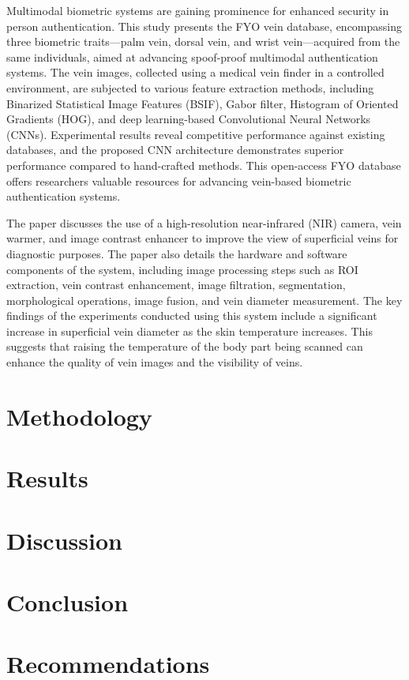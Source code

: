 \documentclass{IEEEtran}
\begin{document}
\cite{toygar2020fyo} Multimodal biometric systems are gaining prominence for enhanced security in person authentication. This study presents the FYO vein database, encompassing three biometric traits—palm vein, dorsal vein, and wrist vein—acquired from the same individuals, aimed at advancing spoof-proof multimodal authentication systems. The vein images, collected using a medical vein finder in a controlled environment, are subjected to various feature extraction methods, including Binarized Statistical Image Features (BSIF), Gabor filter, Histogram of Oriented Gradients (HOG), and deep learning-based Convolutional Neural Networks (CNNs). Experimental results reveal competitive performance against existing databases, and the proposed CNN architecture demonstrates superior performance compared to hand-crafted methods. This open-access FYO database offers researchers valuable resources for advancing vein-based biometric authentication systems.

\cite{ayoub2018diagnostic}The paper discusses the use of a high-resolution near-infrared (NIR) camera, vein warmer, and image contrast enhancer to improve the view of superficial veins for diagnostic purposes. The paper also details the hardware and software components of the system, including image processing steps such as ROI extraction, vein contrast enhancement, image filtration, segmentation, morphological operations, image fusion, and vein diameter measurement.
The key findings of the experiments conducted using this system include a significant increase in superficial vein diameter as the skin temperature increases. This suggests that raising the temperature of the body part being scanned can enhance the quality of vein images and the visibility of veins.



\section{Methodology}

\section{Results}

\section{Discussion}

\section{Conclusion}

\section{Recommendations}


\end{document}
